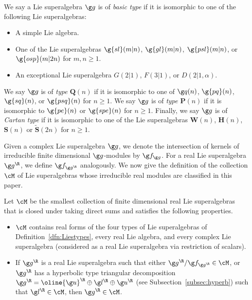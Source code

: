 \documentclass[12pt]{amsart}
\begin{document}
\begin{dfn}
\label{dfn:Liestypes}
We say a Lie superalgebra $\g g$ is of \emph{basic type} if it is isomorphic to one of the following Lie superalgebras:
\begin{itemize}
\item[(i)] A simple Lie algebra. 
\item[(ii)] One of the Lie superalgebras $\g{sl}(m|n)$, $\g{gl}(m|n)$, $\g{psl}(m|n)$, or $\g{osp}(m|2n)$  for $m,n\geq 1$.
\item[(iii)] An exceptional Lie superalgebra $G(2|1)$, $F(3|1)$, or $D(2|1,\alpha)$. 
\end{itemize}
We say $\g g$ is of \emph{type $\mathbf Q(n)$} if it is isomorphic to one of $\g q(n)$, $\g{pq}(n)$, $\g{sq}(n)$, or $\g{psq}(n)$ for $n\geq 1$. We say $\g g$ is of \emph{type $\mathbf P(n)$} if it is isomorphic to  $\g{pe}(n)$ or $\g{spe}(n)$ for $n\geq 1$. Finally, we say $\g g$ is of \emph{Cartan type} if it is isomorphic to one of the Lie superalgebras $\mathbf W(n)$, $\mathbf H(n)$, $\mathbf S(n)$ or $\tilde{\mathbf{S}}(2n)$ for $n\geq 1$. 
\end{dfn}
Given a complex Lie superalgebra $\g g$, we denote the intersection of kernels of irreducible finite dimensional $\g g$-modules by $\g f_{\g g}$. For a real Lie superalgebra $\g g^\R$, we define $\g f_{\g g^\R}$ analogously.  We now give the definition of the collection $\cM$ of Lie superalgebras whose irreducible real modules are classified in this paper.
\begin{dfn}
\label{dfn:classM} Let $\cM$ be the smallest collection of finite dimensional real Lie superalgebras that is closed under taking direct sums and satisfies  the following properties.
\begin{itemize}
\item[(i)] $\cM$ contains real forms of the four types of Lie superalgebras of Definition~\ref{dfn:Liestypes}, every real Lie algebra, 
and every complex Lie superalgebra (considered as a real Lie superalgebra via restriction of scalars).

\item[(ii)] If $\g g^\R$ is a  real Lie superalgebra
such that either   $\g g^\R/\g f_{\g g^\R}\in\cM$, or 
 $\g g^\R$  has a hyperbolic type triangular decomposition $\g g^\R=\oline{\g u}^\R\oplus\g l^\R\oplus \g u^\R$  (see Subsection~\ref{subsec:hyperb}) such that $\g l^\R\in\cM$, then $\g g^\R\in\cM$.  


\end{itemize}\end{dfn}
\end{document}
